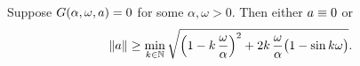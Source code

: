 
\begin{proposition}
	\label{prop:zeroneighborhood2}
	Suppose $G(\alpha,\omega,a)=0$ for some $\alpha,\omega >0$. 
Then either $a \equiv 0$ or 
	\begin{equation}\label{e:minoverk}
	\| a \| \geq \min_{k \in \mathbb{N}}  \sqrt{ \left(1-k \,\frac{\omega}{\alpha} \right)^2 + 2  k \, \frac{\omega}{\alpha} \bigl( 1- \sin k \omega \bigr)} .
	\end{equation}	
\end{proposition}

